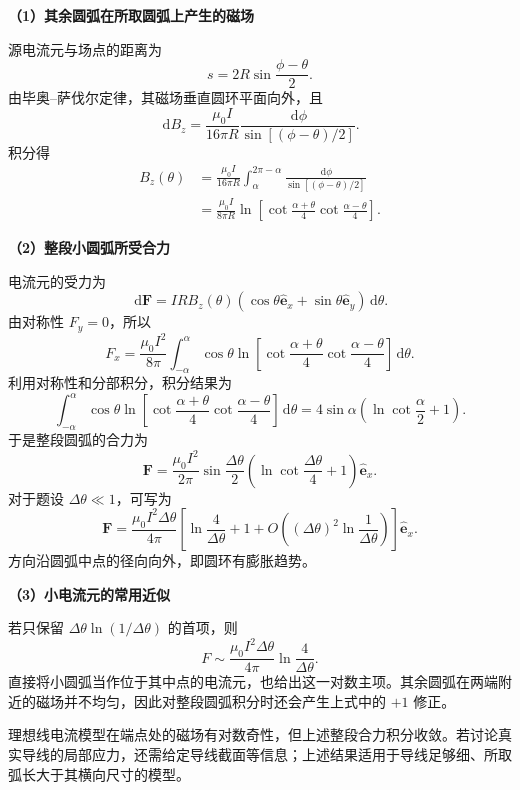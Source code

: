 \documentclass[UTF8,a4paper,12pt]{ctexart}
\newcommand{\dd}{\,\mathrm{d}}
\begin{document}
\textbf{（1）其余圆弧在所取圆弧上产生的磁场}

源电流元与场点的距离为
\[
s=2R\sin\frac{\phi-\theta}{2}.
\]
由毕奥--萨伐尔定律，其磁场垂直圆环平面向外，且
\[
\dd B_z=\frac{\mu_0I}{16\pi R}
\frac{\dd\phi}{\sin[(\phi-\theta)/2]}.
\]
积分得
\[
\begin{aligned}
B_z(\theta)
&=\frac{\mu_0I}{16\pi R}
\int_\alpha^{2\pi-\alpha}
\frac{\dd\phi}{\sin[(\phi-\theta)/2]}\\
&=\frac{\mu_0I}{8\pi R}
\ln\!\left[\cot\frac{\alpha+\theta}{4}
\cot\frac{\alpha-\theta}{4}\right].
\end{aligned}
\]

\textbf{（2）整段小圆弧所受合力}

电流元的受力为
\[
\dd\bm F=IRB_z(\theta)
\left(\cos\theta\hat{\bm e}_x+\sin\theta\hat{\bm e}_y\right)\dd\theta.
\]
由对称性 $F_y=0$，所以
\[
F_x=\frac{\mu_0I^2}{8\pi}
\int_{-\alpha}^{\alpha}\cos\theta
\ln\!\left[\cot\frac{\alpha+\theta}{4}
\cot\frac{\alpha-\theta}{4}\right]\dd\theta.
\]
利用对称性和分部积分，积分结果为
\[
\int_{-\alpha}^{\alpha}\cos\theta
\ln\!\left[\cot\frac{\alpha+\theta}{4}
\cot\frac{\alpha-\theta}{4}\right]\dd\theta
=4\sin\alpha\left(\ln\cot\frac{\alpha}{2}+1\right).
\]
于是整段圆弧的合力为
\[
\boxed{\bm F=\frac{\mu_0I^2}{2\pi}
\sin\frac{\Delta\theta}{2}
\left(\ln\cot\frac{\Delta\theta}{4}+1\right)
\hat{\bm e}_x}.
\]
对于题设 $\Delta\theta\ll1$，可写为
\[
\boxed{\bm F=\frac{\mu_0I^2\Delta\theta}{4\pi}
\left[\ln\frac{4}{\Delta\theta}+1
+O\!\left((\Delta\theta)^2\ln\frac{1}{\Delta\theta}\right)\right]
\hat{\bm e}_x}.
\]
方向沿圆弧中点的径向向外，即圆环有膨胀趋势。

\textbf{（3）小电流元的常用近似}

若只保留 $\Delta\theta\ln(1/\Delta\theta)$ 的首项，则
\[
\boxed{F\sim\frac{\mu_0I^2\Delta\theta}{4\pi}
\ln\frac{4}{\Delta\theta}}.
\]
直接将小圆弧当作位于其中点的电流元，也给出这一对数主项。其余圆弧在两端附近的磁场并不均匀，因此对整段圆弧积分时还会产生上式中的 $+1$ 修正。

理想线电流模型在端点处的磁场有对数奇性，但上述整段合力积分收敛。若讨论真实导线的局部应力，还需给定导线截面等信息；上述结果适用于导线足够细、所取弧长大于其横向尺寸的模型。
\end{document}
